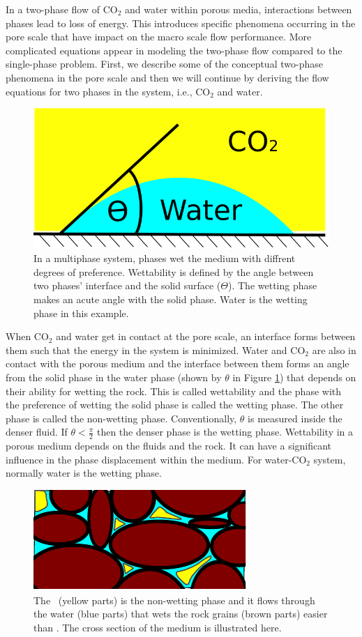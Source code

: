 In a two-phase flow of $\mbox{CO}_2$ and water within porous media, interactions
between phases lead to loss of energy. This introduces specific phenomena
occurring in the pore scale that have impact on the macro scale flow
performance.
More complicated equations appear in modeling the two-phase flow compared to the
single-phase problem. First, we describe some of the conceptual two-phase
phenomena in the pore scale and then we will continue by deriving the flow
equations for two phases in the system, i.e., $\mbox{CO}_2$ and water.

\begin{figure}
 \centering{}
 \includegraphics[width=0.35\linewidth]{./figurer/wettability}
 \caption{In a multiphase system, phases wet the medium with diffrent degrees of preference. Wettability is defined by the angle between two phases' interface and the solid surface ($\Theta$). The wetting phase makes an acute angle with the solid phase. Water is the wetting phase in this example.}
 \label{fig:wetting}
\end{figure}

When $\mbox{CO}_2$ and water get in contact at the pore scale, an interface
forms between them such that the energy in the system is minimized. Water and
$\mbox{CO}_2$ are also in contact with the porous medium and the interface
between them forms an angle from the solid phase in the water phase (shown by
$\theta$ in Figure \ref{fig:wetting}) that depends on their ability for
wetting the rock. This is called wettability and the phase with the
preference of wetting the solid phase is called the wetting phase. The other
phase is called the non-wetting phase.  Conventionally, $\theta$ is measured
inside the denser fluid. If $\theta < \frac{\pi}{2}$ then the denser phase is
the wetting phase. Wettability in a porous medium depends on the fluids and the
rock. It can have a significant influence in the phase displacement within the
medium. For water-$\mbox{CO}_2$ system, normally water is the wetting phase. 

\begin{figure}
 \centering{}
 \includegraphics[width=0.35\linewidth]{./figurer/K2}
  \caption{The \coo\ (yellow parts) is the non-wetting phase and it flows through the water (blue parts) that wets the rock grains (brown parts) easier than \coo. The cross section of the medium is illustrated here. }
 \label{fig:mphf}
\end{figure}

